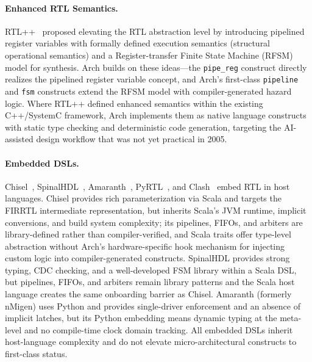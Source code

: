 \documentclass[11pt,twocolumn]{article}
\begin{document}
\paragraph{Enhanced RTL Semantics.}
RTL++~\cite{rtlpp} proposed elevating the RTL abstraction level by introducing pipelined register variables with formally defined execution semantics (structural operational semantics) and a Register-transfer Finite State Machine (RFSM) model for synthesis. Arch builds on these ideas---the \texttt{pipe\_reg} construct directly realizes the pipelined register variable concept, and Arch's first-class \texttt{pipeline} and \texttt{fsm} constructs extend the RFSM model with compiler-generated hazard logic. Where RTL++ defined enhanced semantics within the existing C++/SystemC framework, Arch implements them as native language constructs with static type checking and deterministic code generation, targeting the AI-assisted design workflow that was not yet practical in 2005.

\paragraph{Embedded DSLs.}
Chisel~\cite{chisel}, SpinalHDL~\cite{spinalhdl}, Amaranth~\cite{amaranth}, PyRTL~\cite{pyrtl}, and Clash~\cite{clash} embed RTL in host languages. Chisel provides rich parameterization via Scala and targets the FIRRTL intermediate representation, but inherits Scala's JVM runtime, implicit conversions, and build system complexity; its pipelines, FIFOs, and arbiters are library-defined rather than compiler-verified, and Scala traits offer type-level abstraction without Arch's hardware-specific hook mechanism for injecting custom logic into compiler-generated constructs. SpinalHDL provides strong typing, CDC checking, and a well-developed FSM library within a Scala DSL, but pipelines, FIFOs, and arbiters remain library patterns and the Scala host language creates the same onboarding barrier as Chisel. Amaranth (formerly nMigen) uses Python and provides single-driver enforcement and an absence of implicit latches, but its Python embedding means dynamic typing at the meta-level and no compile-time clock domain tracking. All embedded DSLs inherit host-language complexity and do not elevate micro-architectural constructs to first-class status.
\end{document}
